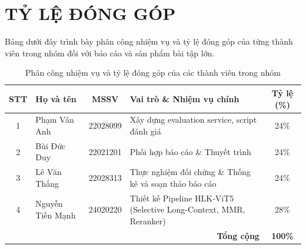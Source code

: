 \chapter*{TỶ LỆ ĐÓNG GÓP}

Bảng dưới đây trình bày phân công nhiệm vụ và tỷ lệ đóng góp của từng thành viên trong nhóm đối với báo cáo và sản phẩm bài tập lớn.

\begin{table}[h]
\centering
\renewcommand{\arraystretch}{1.4}
\begin{tabularx}{\textwidth}{c l c X c}
\hline
\textbf{STT} & \textbf{Họ và tên} & \textbf{MSSV} & \textbf{Vai trò \& Nhiệm vụ chính} & \textbf{Tỷ lệ (\%)} \\ \hline
1 & Phạm Vân Anh & 22028099 & Xây dựng evaluation service, script đánh giá & 24\% \\
2 & Bùi Đức Duy & 22021201 & Phối hợp báo cáo \& Thuyết trình & 24\% \\
3 & Lê Văn Thắng & 22028313 & Thực nghiệm đối chứng \& Thống kê và soạn thảo báo cáo & 24\% \\
4 & Nguyễn Tiến Mạnh & 24020220 & Thiết kế Pipeline HLK-ViT5 (Selective Long-Context, MMR, Reranker) & 28\% \\ \hline
\multicolumn{4}{r}{\textbf{Tổng cộng}} & \textbf{100\%} \\ \hline
\end{tabularx}
\caption{Phân công nhiệm vụ và tỷ lệ đóng góp của các thành viên trong nhóm}
\label{tab:contribution}
\end{table}

